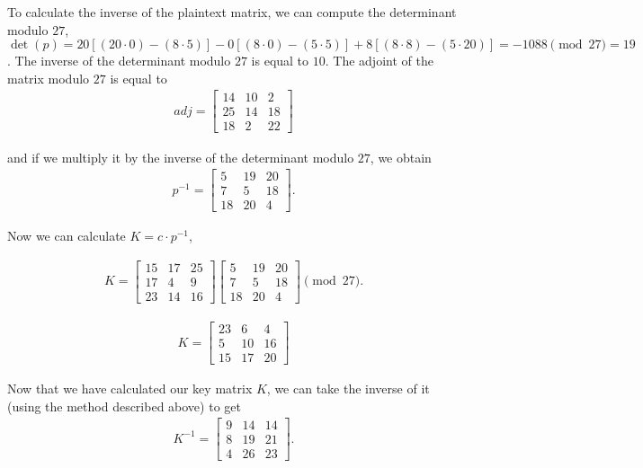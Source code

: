 \documentclass{article}
\begin{document}
To calculate the inverse of the plaintext matrix, we can compute the determinant modulo $27$, $\det(p) = 20[(20 \cdot 0) - (8\cdot 5)] - 0[(8\cdot0) - (5\cdot5)] + 8[(8\cdot8) - (5\cdot20)] = -1088 \pmod{27} = 19$. The inverse of the determinant modulo $27$ is equal to $10$. The adjoint of the matrix modulo $27$ is equal to
\begin{align*}
    adj = 
    \begin{bmatrix}
        14 & 10 & 2\\
        25 & 14 & 18\\
        18 & 2 & 22
    \end{bmatrix}
\end{align*}

and if we multiply it by the inverse of the determinant modulo $27$, we obtain
\begin{align*}
    p^{-1} = 
    \begin{bmatrix}
        5 & 19 & 20\\
        7 & 5 & 18\\
        18 & 20 & 4
    \end{bmatrix}.
\end{align*}

Now we can calculate $K = c\cdot p^{-1}$,

\begin{align*}
    K = 
    \begin{bmatrix}
        15 & 17 & 25\\
        17 & 4 & 9\\
        23 & 14 & 16
    \end{bmatrix}
    \begin{bmatrix}
        5 & 19 & 20\\
        7 & 5 & 18\\
        18 & 20 & 4
    \end{bmatrix}
    \pmod {27}.
\end{align*}

\begin{align*}
    K = 
    \begin{bmatrix}
        23 & 6 & 4\\
        5 & 10 & 16\\
        15 & 17 & 20
    \end{bmatrix}
\end{align*}

Now that we have calculated our key matrix $K$, we can take the inverse of it (using the method described above) to get 
\begin{align*}
    K^{-1} =
    \begin{bmatrix}
        9 & 14 & 14\\
        8 & 19 & 21\\
        4 & 26 & 23
    \end{bmatrix}. 
\end{align*}
\end{document}
